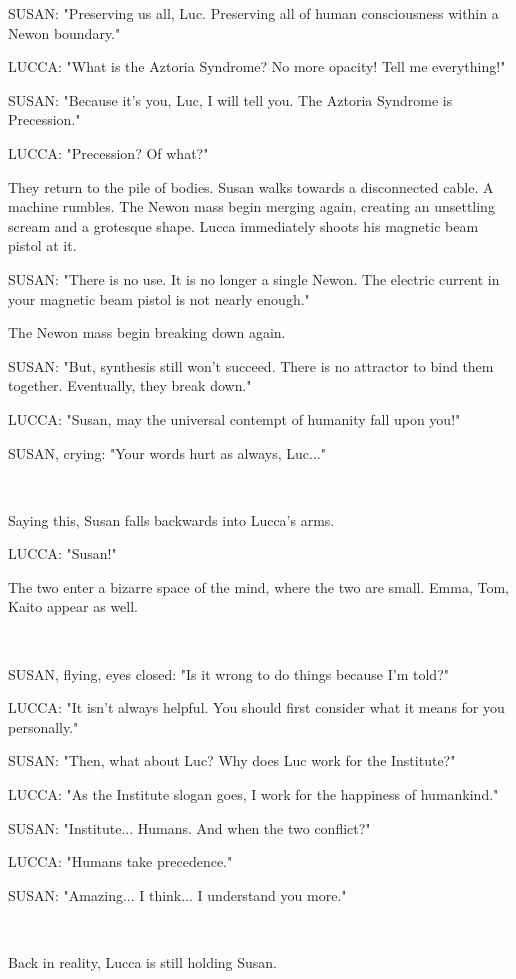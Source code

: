 \documentclass[11pt]{article}
\begin{document}
SUSAN: "Preserving us all, Luc. 
Preserving all of human consciousness within a Newon boundary."

LUCCA: "What is the Aztoria Syndrome?
No more opacity!
Tell me everything!"

SUSAN: "Because it's you, Luc, I will tell you.
The Aztoria Syndrome is Precession."

LUCCA: "Precession? Of what?"

They return to the pile of bodies. 
Susan walks towards a disconnected cable.
A machine rumbles.
The Newon mass begin merging again, creating an unsettling scream and a grotesque shape.
Lucca immediately shoots his magnetic beam pistol at it.

SUSAN: "There is no use. 
It is no longer a single Newon. 
The electric current in your magnetic beam pistol is not nearly enough."

The Newon mass begin breaking down again.

SUSAN: "But, synthesis still won't succeed.
There is no attractor to bind them together.
Eventually, they break down."

LUCCA: "Susan, may the universal contempt of humanity fall upon you!"

SUSAN, crying: "Your words hurt as always, Luc..."

\ 

Saying this, Susan falls backwards into Lucca's arms.

LUCCA: "Susan!"

The two enter a bizarre space of the mind, where the two are small.
Emma, Tom, Kaito appear as well.

\ 

SUSAN, flying, eyes closed: "Is it wrong to do things because I'm told?"

LUCCA: "It isn't always helpful.
You should first consider what it means for you personally."

SUSAN: "Then, what about Luc? 
Why does Luc work for the Institute?"

LUCCA: "As the Institute slogan goes, I work for the happiness of humankind."

SUSAN: "Institute... Humans. And when the two conflict?"

LUCCA: "Humans take precedence."

SUSAN: "Amazing... I think... I understand you more."


\ 

Back in reality, Lucca is still holding Susan.
\end{document}
